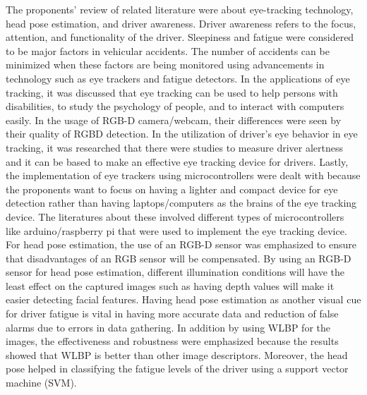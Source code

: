 The proponents’ review of related literature were about eye-tracking technology, head pose estimation, and driver awareness. Driver awareness refers to the focus, attention, and functionality of the driver. Sleepiness and fatigue were considered to be major factors in vehicular accidents. The number of accidents can be minimized when these factors are being monitored using advancements in technology such as eye trackers and fatigue detectors.  In the applications of eye tracking, it was discussed that eye tracking can be used to help persons with disabilities, to study the psychology of people, and to interact with computers easily. In the usage of RGB-D camera/webcam, their differences were seen by their quality of RGBD detection. In the utilization of driver’s eye behavior in eye tracking, it was researched that there were studies to measure driver alertness and it can be based to make an effective eye tracking device for drivers. Lastly, the implementation of eye trackers using microcontrollers were dealt with because the proponents want to focus on having a lighter and compact device for eye detection rather than having laptops/computers as the brains of the eye tracking device. The literatures about these involved different types of microcontrollers like arduino/raspberry pi that were used to implement the eye tracking device. For head pose estimation, the use of an RGB-D sensor was emphasized to ensure that disadvantages of an RGB sensor will be compensated. By using an RGB-D sensor for head pose estimation, different illumination conditions will have the least effect on the captured images such as having depth values will make it easier detecting facial features. Having head pose estimation as another visual cue for driver fatigue is vital in having more accurate data and reduction of false alarms due to errors in data gathering. In addition by using WLBP for the images, the effectiveness and robustness were emphasized because the results showed that WLBP is better than other image descriptors. Moreover, the head pose helped in classifying the fatigue levels of the driver using a support vector machine (SVM). 




